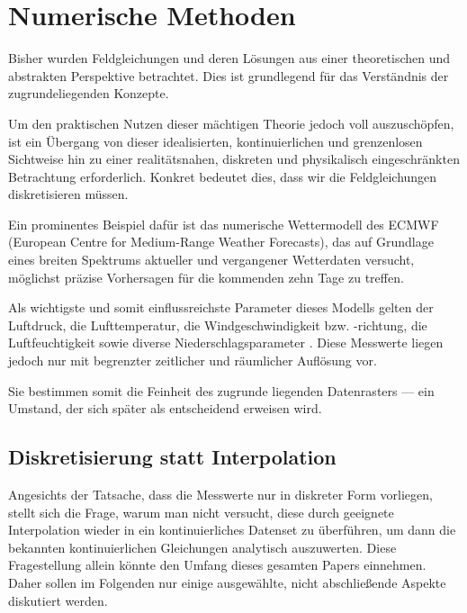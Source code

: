 %
%
%
%
\section{Numerische Methoden}

Bisher wurden Feldgleichungen und deren Lösungen aus einer theoretischen und abstrakten Perspektive betrachtet.
Dies ist grundlegend für das Verständnis der zugrundeliegenden Konzepte.

Um den praktischen Nutzen dieser mächtigen Theorie jedoch voll auszuschöpfen, ist ein Übergang von dieser idealisierten, kontinuierlichen und grenzenlosen Sichtweise hin zu einer realitätsnahen, diskreten und physikalisch eingeschränkten Betrachtung erforderlich.
Konkret bedeutet dies, dass wir die Feldgleichungen diskretisieren müssen.

Ein prominentes Beispiel dafür ist das numerische Wettermodell des ECMWF (European Centre for Medium-Range Weather Forecasts), das auf Grundlage eines breiten Spektrums aktueller und vergangener Wetterdaten versucht, möglichst präzise Vorhersagen für die kommenden zehn Tage zu treffen.

Als wichtigste und somit einflussreichste Parameter dieses Modells gelten der Luftdruck, die Lufttemperatur, die Windgeschwindigkeit bzw. -richtung, die Luftfeuchtigkeit sowie diverse Niederschlagsparameter \cite{parallelisierung:ecmwf2023}.
Diese Messwerte liegen jedoch nur mit begrenzter zeitlicher und räumlicher Auflösung vor.

Sie bestimmen somit die Feinheit des zugrunde liegenden Datenrasters --- ein Umstand, der sich später als entscheidend erweisen wird.

\subsection{Diskretisierung statt Interpolation}

Angesichts der Tatsache, dass die Messwerte nur in diskreter Form vorliegen, stellt sich die Frage, warum man nicht versucht, diese durch geeignete Interpolation wieder in ein kontinuierliches Datenset zu überführen, um dann die bekannten kontinuierlichen Gleichungen analytisch auszuwerten.
Diese Fragestellung allein könnte den Umfang dieses gesamten Papers einnehmen.
Daher sollen im Folgenden nur einige ausgewählte, nicht abschließende Aspekte diskutiert werden.

